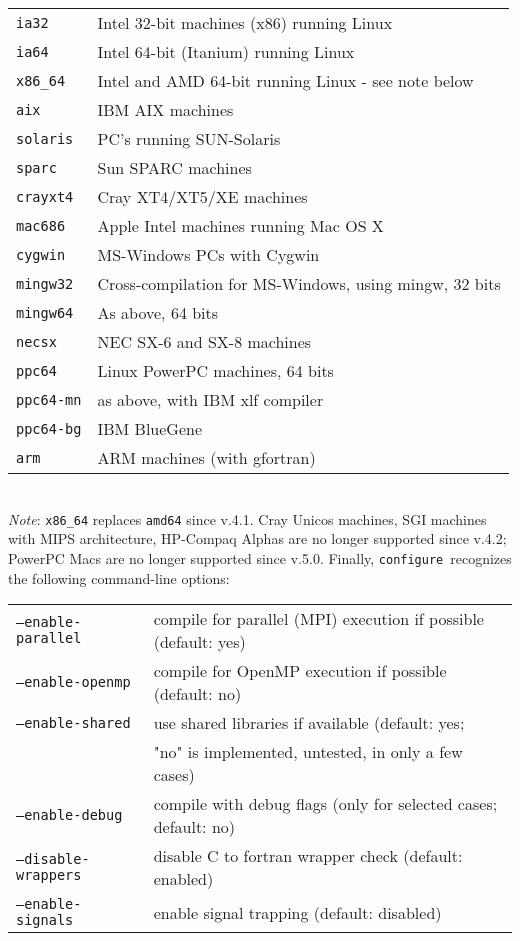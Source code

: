 \documentclass[12pt,a4paper]{article}
\def\configure{\texttt{configure}}
\begin{document}
\begin{tabular}{ll}
\texttt{ia32}&    Intel 32-bit machines (x86) running Linux\\
\texttt{ia64}&    Intel 64-bit (Itanium) running Linux\\
\texttt{x86\_64}&  Intel and AMD 64-bit running Linux - see note below\\
\texttt{aix}&     IBM AIX machines\\
\texttt{solaris}& PC's running SUN-Solaris\\
\texttt{sparc}&   Sun SPARC machines\\
\texttt{crayxt4}& Cray XT4/XT5/XE machines\\
\texttt{mac686}&  Apple Intel machines running Mac OS X\\
\texttt{cygwin}&  MS-Windows PCs with Cygwin\\
\texttt{mingw32}& Cross-compilation for MS-Windows, using mingw, 32 bits\\
\texttt{mingw64}& As above, 64 bits\\
\texttt{necsx}&   NEC SX-6 and SX-8 machines\\
\texttt{ppc64}&   Linux PowerPC machines, 64 bits\\
\texttt{ppc64-mn}&as above, with IBM xlf compiler\\
\texttt{ppc64-bg}&IBM BlueGene\\
\texttt{arm}     &ARM machines (with gfortran)
\end{tabular}\\
{\em Note}: \texttt{x86\_64} replaces \texttt{amd64} since v.4.1.
Cray Unicos machines, SGI
machines with MIPS architecture, HP-Compaq Alphas are no longer supported
since v.4.2; PowerPC Macs are no longer
supported since v.5.0.
Finally, \configure\ recognizes the following command-line options:\\
\begin{tabular}{ll}
\texttt{--enable-parallel}&     compile for parallel (MPI) execution if possible (default: yes)\\
\texttt{--enable-openmp}&       compile for OpenMP execution if possible (default: no)\\
\texttt{--enable-shared}&       use shared libraries if available (default: yes;\\
                        &       "no" is implemented, untested, in only a few cases)\\
\texttt{--enable-debug}&        compile with debug flags (only for selected cases; default: no)\\
\texttt{--disable-wrappers}&    disable C to fortran wrapper check (default: enabled)\\
\texttt{--enable-signals}&      enable signal trapping (default: disabled)\\
\end{tabular}\\
\end{document}
